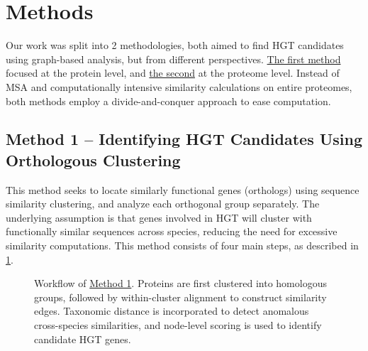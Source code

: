 \documentclass[11pt]{article}
\begin{document}
	\section{Methods}
	Our work was split into 2 methodologies, both aimed to find HGT candidates using graph-based analysis, but from different perspectives. \hyperref[subsec:method1]{The first method} focused at the protein level, and \hyperref[subsec:method2]{the second} at the proteome level. Instead of MSA and computationally intensive similarity calculations on entire proteomes, both methods employ a divide-and-conquer approach to ease computation.
	
	\subsection{Method 1 -- Identifying HGT Candidates Using Orthologous Clustering}
	\label{subsec:method1}
	This method seeks to locate similarly functional genes (orthologs) using sequence similarity clustering, and analyze each orthogonal group separately.
	The underlying assumption is that genes involved in HGT will cluster with functionally similar sequences across species, reducing the need for excessive similarity computations. This method consists of four main steps, as described in \cref{fig:method1-workflow}.
	\begin{figure}[htbp]
		\centering
		
		\caption{Workflow of \hyperref[subsec:method1]{Method 1}. Proteins are first clustered into homologous groups, followed by within-cluster alignment to construct similarity edges. Taxonomic distance is incorporated to detect anomalous cross-species similarities, and node-level scoring is used to identify candidate HGT genes.}
		\label{fig:method1-workflow}
	\end{figure}
	
\end{document}
